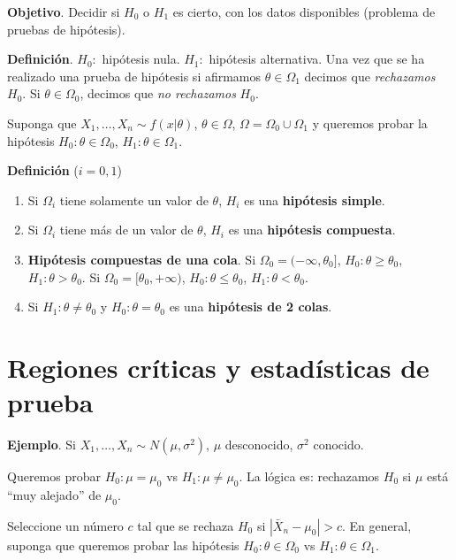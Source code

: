 \documentclass[
  12pt,
]{book}
\begin{document}
\textbf{Objetivo}. Decidir si \(H_0\) o \(H_1\) es cierto, con los datos disponibles (problema de pruebas de hipótesis).

\textbf{Definición}. \(H_0:\) hipótesis nula. \(H_1:\) hipótesis alternativa. Una vez que se ha realizado una prueba de hipótesis si afirmamos \(\theta \in \Omega_1\) decimos que \emph{rechazamos} \(H_0\). Si \(\theta \in \Omega_0\), decimos que \emph{no rechazamos} \(H_0\).

Suponga que \(X_1,\dots, X_n\sim f(x|\theta)\), \(\theta \in \Omega\), \(\Omega = \Omega_0 \cup\Omega_1\) y queremos probar la hipótesis \(H_0: \theta \in \Omega_0\), \(H_1: \theta \in \Omega_1\).

\textbf{Definición} (\(i = 0,1\))

\begin{enumerate}
\def\labelenumi{\arabic{enumi})}
\item
  Si \(\Omega_i\) tiene solamente un valor de \(\theta\), \(H_i\) es una \textbf{hipótesis simple}.
\item
  Si \(\Omega_i\) tiene más de un valor de \(\theta\), \(H_i\) es una \textbf{hipótesis compuesta}.
\item
  \textbf{Hipótesis compuestas de una cola}. Si \(\Omega_0 = (-\infty,\theta_0]\), \(H_0: \theta\geq \theta_0\), \(H_1: \theta >\theta_0\). Si \(\Omega_0 = [\theta_0,+\infty)\), \(H_0: \theta\leq \theta_0\), \(H_1: \theta<\theta_0\).
\item
  Si \(H_1: \theta \ne \theta_0\) y \(H_0: \theta = \theta_0\) es una \textbf{hipótesis de 2 colas}.
\end{enumerate}

\hypertarget{regiones-cruxedticas-y-estaduxedsticas-de-prueba}{%
\section{Regiones críticas y estadísticas de prueba}\label{regiones-cruxedticas-y-estaduxedsticas-de-prueba}}

\textbf{Ejemplo}. Si \(X_1,\dots, X_n \sim N(\mu,\sigma^2)\), \(\mu\) desconocido, \(\sigma^2\) conocido.

Queremos probar \(H_0: \mu = \mu_0\) vs \(H_1: \mu\neq \mu_0\). La lógica es: rechazamos \(H_0\) si \(\mu\) está ``muy alejado'' de \(\mu_0\).

Seleccione un número \(c\) tal que se rechaza \(H_0\) si \(|\bar X_n -\mu_0|>c\). En general, suponga que queremos probar las hipótesis \(H_0: \theta \in \Omega_0\) vs \(H_1: \theta\in \Omega_1\).
\end{document}

